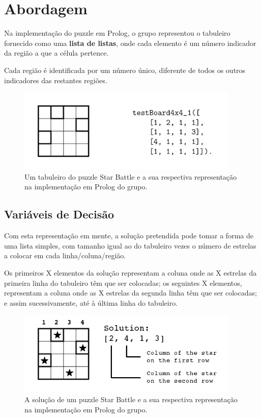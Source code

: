 \documentclass[runningheads,a4paper]{llncs}
\begin{document}
\section{Abordagem}

Na implementação do puzzle em Prolog, o grupo representou o tabuleiro fornecido como uma \textbf{lista de listas}, onde cada elemento é um número indicador da região a que a célula pertence.

Cada região é identificada por um número único, diferente de todos os outros indicadores das restantes regiões.

\begin{figure}
\centering
\includegraphics[height=4cm]{res/boardRepresentationExample}
\caption{Um tabuleiro do puzzle Star Battle e a sua respectiva representação na implementação em Prolog do grupo.}
\label{fig:example}
\end{figure}


\subsection{Variáveis de Decisão}

Com esta representação em mente, a solução pretendida pode tomar a forma de uma lista simples, com tamanho igual ao do tabuleiro vezes o número de estrelas a colocar em cada linha/coluna/região.

Os primeiros X elementos da solução representam a coluna onde as X estrelas da primeira linha do tabuleiro têm que ser colocadas; os seguintes X elementos, representam a coluna onde as X estrelas da segunda linha têm que ser colocadas; e assim sucessivamente, até à última linha do tabuleiro.

\begin{figure}
\centering
\includegraphics[height=4cm]{res/solutionRepresentationExample}
\caption{A solução de um puzzle Star Battle e a sua respectiva representação na implementação em Prolog do grupo.}
\label{fig:example}
\end{figure}
\end{document}
